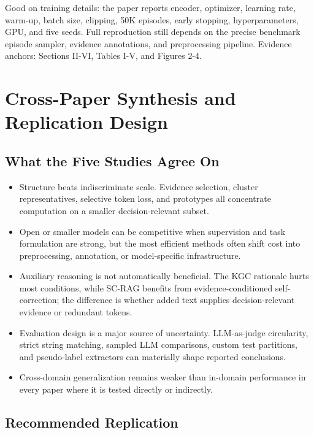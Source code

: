 \documentclass[11pt]{article}
\begin{document}
Good on training details: the paper reports encoder, optimizer, learning
rate, warm-up, batch size, clipping, 50K episodes, early stopping,
hyperparameters, GPU, and five seeds. Full reproduction still depends on
the precise benchmark episode sampler, evidence annotations, and
preprocessing pipeline. Evidence anchors: Sections II-VI, Tables I-V,
and Figures 2-4.

\clearpage
\section{Cross-Paper Synthesis and Replication Design}
\label{cross-paper-synthesis-and-replication-design}

\subsection{What the Five Studies Agree
On}\label{what-the-five-studies-agree-on}

\begin{itemize}
\item
  Structure beats indiscriminate scale. Evidence selection, cluster
  representatives, selective token loss, and prototypes all concentrate
  computation on a smaller decision-relevant subset.
\item
  Open or smaller models can be competitive when supervision and task
  formulation are strong, but the most efficient methods often shift
  cost into preprocessing, annotation, or model-specific infrastructure.
\item
  Auxiliary reasoning is not automatically beneficial. The KGC rationale
  hurts most conditions, while SC-RAG benefits from evidence-conditioned
  self-correction; the difference is whether added text supplies
  decision-relevant evidence or redundant tokens.
\item
  Evaluation design is a major source of uncertainty. LLM-as-judge
  circularity, strict string matching, sampled LLM comparisons, custom
  test partitions, and pseudo-label extractors can materially shape
  reported conclusions.
\item
  Cross-domain generalization remains weaker than in-domain performance
  in every paper where it is tested directly or indirectly.
\end{itemize}

\subsection{Recommended Replication}\label{recommended-replication}
\end{document}
